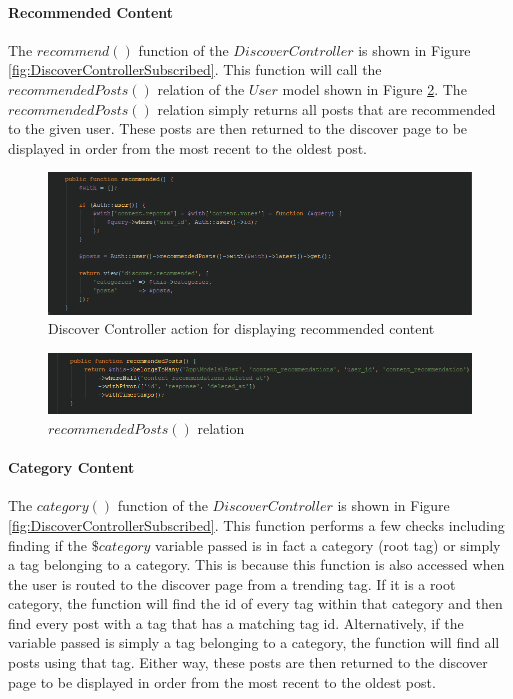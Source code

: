 \paragraph{Recommended Content}
The $recommend()$ function of the $Discover  Controller$ is shown in Figure \ref{fig:DiscoverControllerSubscribed}. This function will call the $recommendedPosts()$ relation of the $User$ model shown in Figure \ref{fig:RecommendedPosts}. The $recommendedPosts()$ relation simply returns all posts that are recommended to the given user. These posts are then returned to the discover page to be displayed in order from the most recent to the oldest post.

\begin{figure}[H]
\centering
\includegraphics[width=\textwidth]{Images/Implementation/DiscoverControllerRecommended}
\caption{Discover Controller action for displaying recommended content }
\label{fig:DiscoverControllerRecommended}
\end{figure}

\begin{figure}[H]
\centering
\includegraphics[width=\textwidth]{Images/Implementation/RecommendedPosts}
\caption{$recommendedPosts()$ relation}
\label{fig:RecommendedPosts}
\end{figure}

\paragraph{Category Content}
The $category()$ function of the $Discover  Controller$ is shown in Figure \ref{fig:DiscoverControllerSubscribed}. This function performs a few checks including finding if the $\$category$ variable passed is in fact a category (root tag) or simply a tag belonging to a category. This is because this function is also accessed when the user is routed to the discover page from a trending tag. If it is a root category, the function will find the id of every tag within that category and then find every post with a tag that has a matching tag id. Alternatively, if the variable passed is simply a tag belonging to a category, the function will find all posts using that tag. Either way, these posts are then returned to the discover page to be displayed in order from the most recent to the oldest post.


